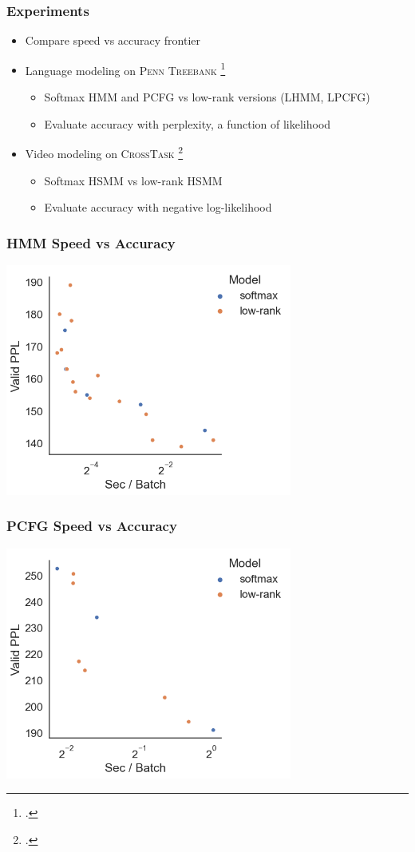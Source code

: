 \documentclass{beamer}
\begin{document}
\begin{frame}
\frametitle{Experiments}
\begin{itemize}
\item Compare speed vs accuracy frontier
\vspace{2em}
\item Language modeling on \textsc{Penn Treebank} \footcite{ptb}
    \vspace{1em}
    \begin{itemize}
    \item Softmax HMM and PCFG vs low-rank versions (LHMM, LPCFG)
    \item Evaluate accuracy with perplexity, a function of likelihood
    \end{itemize}
\vspace{2em}
\item Video modeling on \textsc{CrossTask} \footcite{zhukov2019cross}
    \vspace{1em}
    \begin{itemize}
    \item Softmax HSMM vs low-rank HSMM
    \item Evaluate accuracy with negative log-likelihood
    \end{itemize}
\end{itemize}
\end{frame}

\begin{frame}
\frametitle{HMM Speed vs Accuracy}
\centering
\includegraphics[height=3in]{imgs/hmm/lhmm-speed-accuracy.png}
\end{frame}

\begin{frame}
\frametitle{PCFG Speed vs Accuracy}
\centering
\includegraphics[height=3in]{imgs/hmm/pcfg-speed-accuracy.png}
\end{frame}
\end{document}
